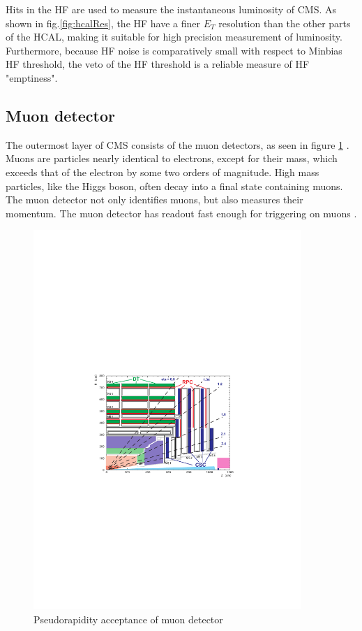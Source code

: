 Hits in the HF are used to measure the instantaneous luminosity of CMS. As shown in fig.\ref{fig:hcalRes}, the HF have a finer $E_T$ resolution than the other parts of the HCAL, making it suitable for high precision measurement of luminosity. Furthermore, because HF noise is comparatively small with respect to Minbias HF threshold, the veto of the HF threshold is a reliable measure of HF "emptiness". 

\subsection{Muon detector}

The outermost layer of CMS consists of the muon detectors, as seen in figure \ref{fig:muonYZ} \cite{Bayatian:2006nff}. Muons are particles nearly identical to electrons, except for their mass, which exceeds that of the electron by some two orders of magnitude. High mass particles, like the Higgs boson, often decay into a final state containing muons. The muon detector not only identifies muons, but also measures their momentum. The muon detector has readout fast enough for triggering on muons \cite{CMS_AN_2008-098} \cite{cmsTnP}.

\begin{figure}[]
\begin{centering}
\includegraphics[width=4in]{Chapter3/importfigs/Figure_001-006.pdf}
\par\end{centering}
\caption{Pseudorapidity acceptance of muon detector \cite{Bayatian:2006nff}\label{fig:muonYZ}}
\end{figure}

